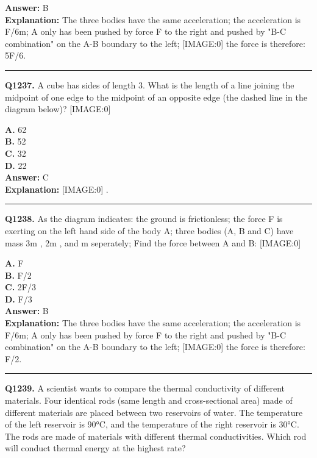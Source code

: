 \documentclass[12pt]{article}
\begin{document}
\textbf{Answer:} B \\
\textbf{Explanation:} The three bodies have the same acceleration; the acceleration is F/6m; A only has been pushed by force
F
to the right and pushed by "B-C combination" on the A-B boundary to the left;
[IMAGE:0]
the force is therefore: 5F/6.

\hrule
\vspace{1em}


\noindent
\textbf{Q1237.} A cube has sides of length 3. What is the length of a line joining the midpoint of one edge to the midpoint of an opposite edge (the dashed line in the diagram below)?
[IMAGE:0]



\textbf{A.} 6\sqrt{}2 \\
\textbf{B.} 5\sqrt{}2 \\
\textbf{C.} 3\sqrt{}2 \\
\textbf{D.} 2\sqrt{}2 \\

\textbf{Answer:} C \\
\textbf{Explanation:} [IMAGE:0]
.

\hrule
\vspace{1em}


\noindent
\textbf{Q1238.} As the diagram indicates: the ground is frictionless; the force
F
is exerting on the left hand side of the body A; three bodies (A, B and C) have mass
3m
,
2m
, and
m
seperately; Find the force between A and B:
[IMAGE:0]



\textbf{A.} F \\
\textbf{B.} F/2 \\
\textbf{C.} 2F/3 \\
\textbf{D.} F/3 \\

\textbf{Answer:} B \\
\textbf{Explanation:} The three bodies have the same acceleration; the acceleration is F/6m; A only has been pushed by force
F
to the right and pushed by "B-C combination" on the A-B boundary to the left;
[IMAGE:0]
the force is therefore: F/2.

\hrule
\vspace{1em}


\noindent
\textbf{Q1239.} A scientist wants to compare the thermal conductivity of different materials. Four identical rods (same length and cross-sectional area) made of different materials are placed between two reservoirs of water. The temperature of the left reservoir is 90°C, and the temperature of the right reservoir is 30°C. The rods are made of materials with different thermal conductivities.
Which rod will conduct thermal energy at the highest rate?
\end{document}
